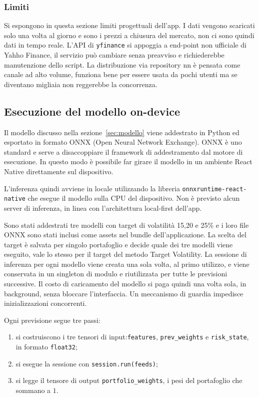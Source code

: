 \subsubsection{Limiti}
Si espongono in questa sezione limiti progettuali dell'app.
I dati vengono scaricati solo una volta al giorno e sono i prezzi a chiusura del mercato, non ci sono quindi dati in tempo reale.
L'API di \lstinline{yfinance} si appoggia a end-point non ufficiale di Yahho Finance, il servizio può cambiare senza preavviso e richiederebbe manutenzione dello script.
La distribuzione via repository nn è pensata come canale ad alto volume, funziona bene per essere usata da pochi utenti ma se diventano migliaia non reggerebbe la concorrenza.

\subsection{Esecuzione del modello on-device}
\label{subsec:inferenza-onnx}

Il modello discusso nella sezione~\ref{sec:modello} viene addestrato in Python ed esportato in formato ONNX (Open Neural Network Exchange).
ONNX è uno standard e serve a disaccoppiare il framework di addestramento dal motore di esecuzione.
In questo modo è possibile far girare il modello in un ambiente React Native direttamente sul dispositivo.

L'inferenza quindi avviene in locale utilizzando la libreria \lstinline{onnxruntime-react-native} che esegue il modello sulla CPU del dispositivo.
Non è previsto alcun server di inferenza, in linea con l'architettura local-first dell'app.


Sono stati addestrati tre modelli con target di volatilità 15,20 e 25\% e i loro file ONNX sono stati inclusi come assets nel bundle dell'applicazione.
La scelta del target è salvata per singolo portafoglio e decide quale dei tre modelli viene eseguito, vale lo stesso per il target del metodo Target Volatility.
La sessione di inferenza per ogni modello viene creata una sola volta, al primo utilizzo, e viene conservata in un singleton di modulo e riutilizzata per tutte le previsioni successive. 
Il costo di caricamento del modello si paga quindi una volta sola, in background, senza bloccare l'interfaccia. 
Un meccanismo di guardia impedisce inizializzazioni concorrenti.

Ogni previsione segue tre passi:
\begin{enumerate}
  \item si costruiscono i tre tensori di input:\lstinline{features}, \lstinline{prev_weights} e \lstinline{risk_state}, in formato \lstinline{float32};
  \item si esegue la sessione con \lstinline{session.run(feeds)};
  \item si legge il tensore di output \lstinline{portfolio_weights}, i pesi del
  portafoglio che sommano a $1$.
\end{enumerate}

